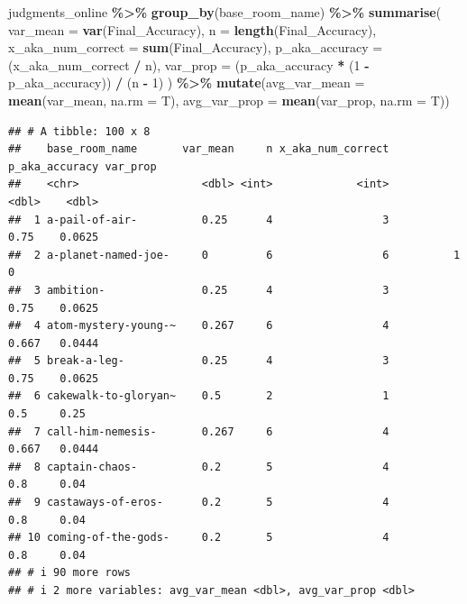 \documentclass[
]{article}
\newenvironment{Shaded}{\begin{snugshade}}{\end{snugshade}}
\newcommand{\AttributeTok}[1]{\textcolor[rgb]{0.13,0.29,0.53}{#1}}
\newcommand{\DecValTok}[1]{\textcolor[rgb]{0.00,0.00,0.81}{#1}}
\newcommand{\FunctionTok}[1]{\textcolor[rgb]{0.13,0.29,0.53}{\textbf{#1}}}
\newcommand{\NormalTok}[1]{#1}
\newcommand{\SpecialCharTok}[1]{\textcolor[rgb]{0.81,0.36,0.00}{\textbf{#1}}}
\begin{document}
\begin{Shaded}
\begin{Highlighting}[]
\NormalTok{judgments\_online }\SpecialCharTok{\%\textgreater{}\%}
  \FunctionTok{group\_by}\NormalTok{(base\_room\_name) }\SpecialCharTok{\%\textgreater{}\%}
  \FunctionTok{summarise}\NormalTok{(}
    \AttributeTok{var\_mean =} \FunctionTok{var}\NormalTok{(Final\_Accuracy),}
    \AttributeTok{n =} \FunctionTok{length}\NormalTok{(Final\_Accuracy),}
    \AttributeTok{x\_aka\_num\_correct =} \FunctionTok{sum}\NormalTok{(Final\_Accuracy),}
    \AttributeTok{p\_aka\_accuracy =}\NormalTok{ (x\_aka\_num\_correct }\SpecialCharTok{/}\NormalTok{ n),}
    \AttributeTok{var\_prop =}\NormalTok{ (p\_aka\_accuracy }\SpecialCharTok{*}\NormalTok{ (}\DecValTok{1} \SpecialCharTok{{-}}\NormalTok{ p\_aka\_accuracy)) }\SpecialCharTok{/}\NormalTok{ (n }\SpecialCharTok{{-}} \DecValTok{1}\NormalTok{)}
\NormalTok{  ) }\SpecialCharTok{\%\textgreater{}\%} \FunctionTok{mutate}\NormalTok{(}\AttributeTok{avg\_var\_mean =} \FunctionTok{mean}\NormalTok{(var\_mean, }\AttributeTok{na.rm =}\NormalTok{ T),}
               \AttributeTok{avg\_var\_prop =} \FunctionTok{mean}\NormalTok{(var\_prop, }\AttributeTok{na.rm =}\NormalTok{ T))}
\end{Highlighting}
\end{Shaded}

\begin{verbatim}
## # A tibble: 100 x 8
##    base_room_name       var_mean     n x_aka_num_correct p_aka_accuracy var_prop
##    <chr>                   <dbl> <int>             <int>          <dbl>    <dbl>
##  1 a-pail-of-air-          0.25      4                 3          0.75    0.0625
##  2 a-planet-named-joe-     0         6                 6          1       0     
##  3 ambition-               0.25      4                 3          0.75    0.0625
##  4 atom-mystery-young-~    0.267     6                 4          0.667   0.0444
##  5 break-a-leg-            0.25      4                 3          0.75    0.0625
##  6 cakewalk-to-gloryan~    0.5       2                 1          0.5     0.25  
##  7 call-him-nemesis-       0.267     6                 4          0.667   0.0444
##  8 captain-chaos-          0.2       5                 4          0.8     0.04  
##  9 castaways-of-eros-      0.2       5                 4          0.8     0.04  
## 10 coming-of-the-gods-     0.2       5                 4          0.8     0.04  
## # i 90 more rows
## # i 2 more variables: avg_var_mean <dbl>, avg_var_prop <dbl>
\end{verbatim}
\end{document}
